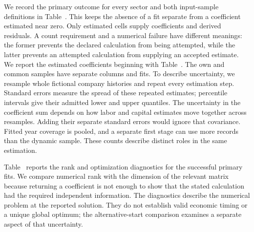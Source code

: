 We record the primary outcome for every sector and both input-sample definitions in Table~. This keeps the absence of a fit separate from a coefficient estimated near zero.
Only estimated cells supply coefficients and derived residuals. A count requirement and a numerical failure have different meanings: the former prevents the declared calculation from being attempted, while the latter prevents an attempted calculation from supplying an accepted estimate.
We report the estimated coefficients beginning with Table~. The own and common samples have separate columns and fits. To describe uncertainty, we resample whole fictional company histories and repeat every estimation step. Standard errors measure the spread of these repeated estimates; percentile intervals give their admitted lower and upper quantiles.
The uncertainty in the coefficient sum depends on how labor and capital estimates move together across resamples. Adding their separate standard errors would ignore that covariance. Fitted year coverage is pooled, and a separate first stage can use more records than the dynamic sample. These counts describe distinct roles in the same estimation.

Table~ reports the rank and optimization diagnostics for the successful primary fits. We compare numerical rank with the dimension of the relevant matrix because returning a coefficient is not enough to show that the stated calculation had the required independent information.
The diagnostics describe the numerical problem at the reported solution. They do not establish valid economic timing or a unique global optimum; the alternative-start comparison examines a separate aspect of that uncertainty.

